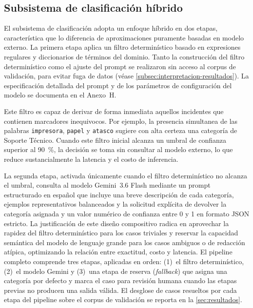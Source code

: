 \subsection{Subsistema de clasificación híbrido}\label{subsec:subsistema-clasificacion}

El subsistema de clasificación adopta un enfoque híbrido en dos etapas, característica que lo diferencia de aproximaciones puramente basadas en modelo externo. La primera etapa aplica un filtro determinístico basado en expresiones regulares y diccionarios de términos del dominio. Tanto la construcción del filtro determinístico como el ajuste del prompt se realizaron sin acceso al corpus de validación, para evitar fuga de datos (véase \autoref{subsec:interpretacion-resultados}). La especificación detallada del prompt y de los parámetros de configuración del modelo se documenta en el Anexo~H.

Este filtro es capaz de derivar de forma inmediata aquellos incidentes que contienen marcadores inequivocos. Por ejemplo, la presencia simultanea de las palabras \texttt{impresora}, \texttt{papel} y \texttt{atasco} sugiere con alta certeza una categoría de Soporte Técnico. Cuando este filtro inicial alcanza un umbral de confianza superior al 90~\%, la decisión se toma sin consultar al modelo externo, lo que reduce sustancialmente la latencia y el costo de inferencia.

La segunda etapa, activada únicamente cuando el filtro determinístico no alcanza el umbral, consulta al modelo Gemini~3.6 Flash mediante un prompt estructurado en español que incluye una breve descripción de cada categoría, ejemplos representativos balanceados y la solicitud explícita de devolver la categoría asignada y un valor numérico de confianza entre 0 y 1 en formato JSON estricto. La justificación de este diseño compositivo radica en aprovechar la rapidez del filtro determinístico para los casos triviales y reservar la capacidad semántica del modelo de lenguaje grande para los casos ambiguos o de redacción atípica, optimizando la relación entre exactitud, costo y latencia. El pipeline completo comprende tres etapas, aplicadas en orden: (1)~el filtro determinístico, (2)~el modelo Gemini y (3)~una etapa de reserva (\emph{fallback}) que asigna una categoría por defecto y marca el caso para revisión humana cuando las etapas previas no producen una salida válida. El desglose de casos resueltos por cada etapa del pipeline sobre el corpus de validación se reporta en la \autoref{sec:resultados}.

